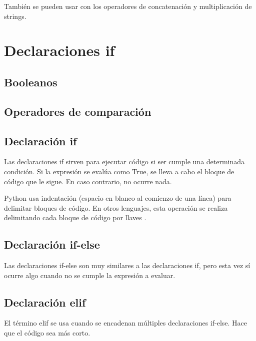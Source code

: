 \documentclass{report}
\begin{document}

También se pueden usar con los operadores de concatenación y multiplicación de strings.


\clearpage\chapter{Declaraciones if}

\section{Booleanos}

\section{Operadores de comparación}

\section{Declaración if}

Las declaraciones if sirven para ejecutar código si ser cumple una determinada condición. Si la expresión se evalúa como True, se lleva a cabo el bloque de código que le sigue. En caso contrario, no ocurre nada.


Python usa indentación (espacio en blanco al comienzo de una línea) para delimitar bloques de código. En otros lenguajes, esta operación se realiza delimitando cada bloque de código por llaves {}.

\section{Declaración if-else}

Las declaraciones if-else son muy similares a las declaraciones if, pero esta vez sí ocurre algo cuando no se cumple la expresión a evaluar.



\section{Declaración elif}

El término elif se usa cuando se encadenan múltiples declaraciones if-else. Hace que el código sea más corto.
\end{document}
